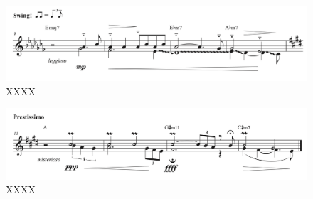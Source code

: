 \begin{figure}[h]
\includegraphics[clip,width=\columnwidth]{figures/images/sheet3.png}%
\caption{\small{XXXX}}
\label{fig: Sheet music aug 3}
\end{figure}

\begin{figure}[h]
\includegraphics[clip,width=\columnwidth]{figures/images/sheet4.png}%
\caption{\small{XXXX}}
\label{fig: Sheet music aug 4}
\end{figure}